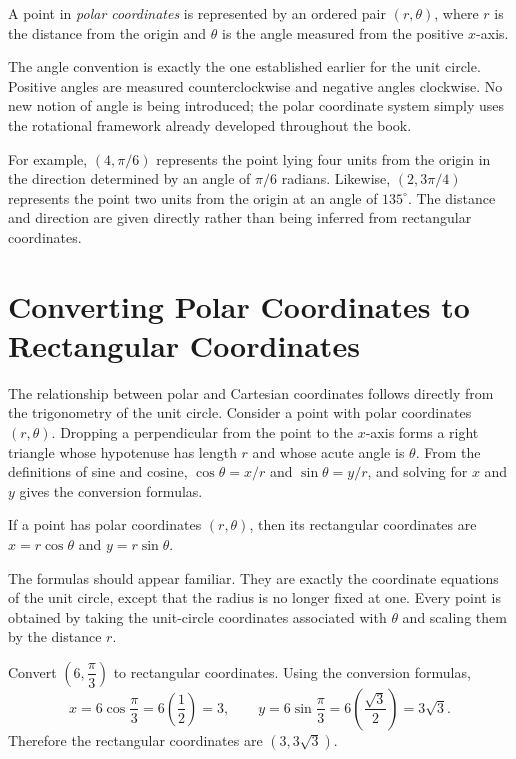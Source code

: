 \begin{definition}
A point in \emph{polar coordinates} is represented by an ordered pair
$(r,\theta)$, where $r$ is the distance from the origin and $\theta$ is
the angle measured from the positive $x$-axis.
\end{definition}

The angle convention is exactly the one established earlier for the unit
circle. Positive angles are measured counterclockwise and negative angles
clockwise. No new notion of angle is being introduced; the polar
coordinate system simply uses the rotational framework already developed
throughout the book.

For example, $(4,\pi/6)$ represents the point lying four units from the
origin in the direction determined by an angle of $\pi/6$ radians.
Likewise, $(2,3\pi/4)$ represents the point two units from the origin at
an angle of $135^\circ$. The distance and direction are given directly
rather than being inferred from rectangular coordinates.

\section{Converting Polar Coordinates to Rectangular Coordinates}

The relationship between polar and Cartesian coordinates follows directly
from the trigonometry of the unit circle. Consider a point with polar
coordinates $(r,\theta)$. Dropping a perpendicular from the point to the
$x$-axis forms a right triangle whose hypotenuse has length $r$ and whose
acute angle is $\theta$. From the definitions of sine and cosine,
$\cos\theta = x/r$ and $\sin\theta = y/r$, and solving for $x$ and $y$
gives the conversion formulas.

\begin{theorem}
If a point has polar coordinates $(r,\theta)$, then its rectangular
coordinates are $x = r\cos\theta$ and $y = r\sin\theta$.
\end{theorem}

The formulas should appear familiar. They are exactly the coordinate
equations of the unit circle, except that the radius is no longer fixed at
one. Every point is obtained by taking the unit-circle coordinates
associated with $\theta$ and scaling them by the distance $r$.

\begin{example}
Convert $\left(6,\dfrac{\pi}{3}\right)$ to rectangular coordinates. Using
the conversion formulas,
\[
x = 6\cos\frac{\pi}{3} = 6\left(\frac12\right) = 3, \qquad
y = 6\sin\frac{\pi}{3} = 6\left(\frac{\sqrt3}{2}\right) = 3\sqrt3.
\]
Therefore the rectangular coordinates are $(3, 3\sqrt3)$.
\end{example}

